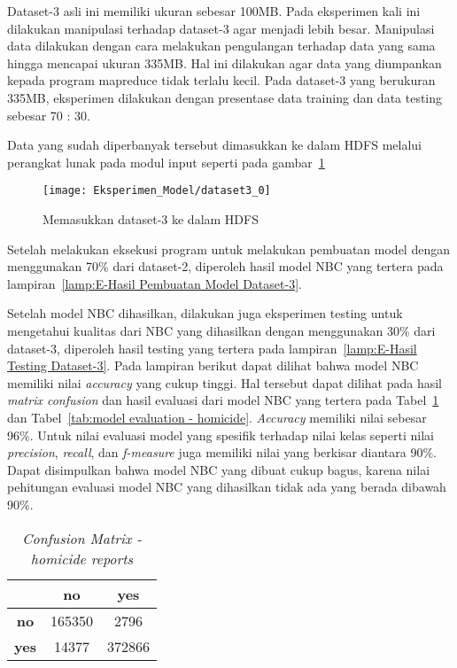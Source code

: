 Dataset-3 asli ini memiliki ukuran sebesar 100MB. Pada eksperimen kali ini dilakukan manipulasi terhadap dataset-3 agar menjadi lebih besar. Manipulasi data dilakukan dengan cara melakukan pengulangan terhadap data yang sama hingga mencapai ukuran 335MB. Hal ini dilakukan agar data yang diumpankan kepada program mapreduce tidak terlalu kecil. Pada dataset-3 yang berukuran 335MB, eksperimen dilakukan dengan presentase data training dan data testing sebesar 70 : 30.

Data yang sudah diperbanyak tersebut dimasukkan ke dalam HDFS melalui perangkat lunak pada modul input seperti pada gambar~\ref{fig:Memasukkan dataset-3 ke dalam HDFS}

\begin{figure}[H]
	\centering
	\texttt{[image: Eksperimen\_Model/dataset3\_0]}
	\caption[Memasukkan dataset-3 ke dalam HDFS]{Memasukkan dataset-3 ke dalam HDFS}
	\label{fig:Memasukkan dataset-3 ke dalam HDFS}
\end{figure}

Setelah melakukan eksekusi program untuk melakukan pembuatan model dengan menggunakan 70\% dari dataset-2, diperoleh hasil model NBC yang tertera pada lampiran~\ref{lamp:E-Hasil Pembuatan Model Dataset-3}.

Setelah model NBC dihasilkan, dilakukan juga eksperimen testing untuk mengetahui kualitas dari NBC yang dihasilkan dengan menggunakan 30\% dari dataset-3, diperoleh hasil testing yang tertera pada lampiran~\ref{lamp:E-Hasil Testing Dataset-3}. Pada lampiran berikut dapat dilihat bahwa model NBC memiliki nilai \textit{accuracy} yang cukup tinggi. Hal tersebut dapat dilihat pada hasil \textit{matrix confusion} dan hasil evaluasi dari model NBC yang tertera pada Tabel~\ref{tab:confusion matrix - homicide} dan Tabel~\ref{tab:model evaluation - homicide}. \textit{Accuracy} memiliki nilai sebesar 96\%. Untuk nilai evaluasi model yang spesifik terhadap nilai kelas seperti nilai \textit{precision}, \textit{recall}, dan \textit{f-measure} juga memiliki nilai yang berkisar diantara 90\%. Dapat disimpulkan bahwa model NBC yang dibuat cukup bagus, karena nilai pehitungan evaluasi model NBC yang dihasilkan tidak ada yang berada dibawah 90\%.

\begin{table}[H]
\label{tab:confusion matrix - homicide}
\centering
\caption{\textit{Confusion Matrix - homicide reports}}
\begin{tabular}{ | c | c | c | }
\hline
& \textbf{no} & \textbf{yes} \\ \hline \hline
\textbf{no} & 165350 & 2796 \\ \hline
\textbf{yes} & 14377 & 372866 \\ \hline
\end{tabular}
\end{table}

